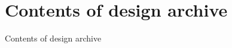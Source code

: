 \chapter{Contents of design archive} \label{Appendix:Archive}

Contents of design archive

\clearpage
